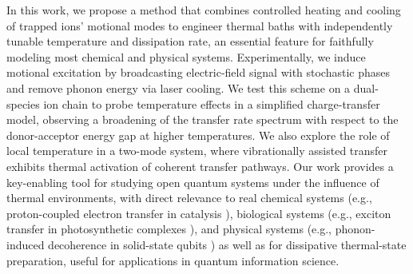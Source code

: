 \documentclass[%
reprint,
superscriptaddress,
amsmath,amssymb,
aps,
prl,
floatfix,
]{revtex4-2}
\begin{document}
In this work, we propose a method that combines controlled heating and cooling of trapped ions’ motional modes to engineer thermal baths with independently tunable temperature and dissipation rate, an essential feature for faithfully modeling most chemical and physical systems. Experimentally, we induce motional excitation by broadcasting electric-field signal with stochastic phases and remove phonon energy via laser cooling. We test this scheme on a dual-species ion chain to probe temperature effects in a simplified charge-transfer model, observing a broadening of the transfer rate spectrum with respect to the donor-acceptor energy gap at higher temperatures. We also explore the role of local temperature in a two-mode system, where vibrationally assisted transfer exhibits thermal activation of coherent transfer pathways. Our work provides a key-enabling tool for studying open quantum systems under the influence of thermal environments, with direct relevance to real chemical systems (e.g., proton-coupled electron transfer in catalysis \cite{mayer2004proton}), biological systems (e.g., exciton transfer in photosynthetic complexes \cite{fassioli2014vibration}), and physical systems (e.g., phonon-induced decoherence in solid-state qubits \cite{jarmola2012diamond}) as well as for dissipative thermal-state preparation, useful for applications in quantum information science.

\end{document}
